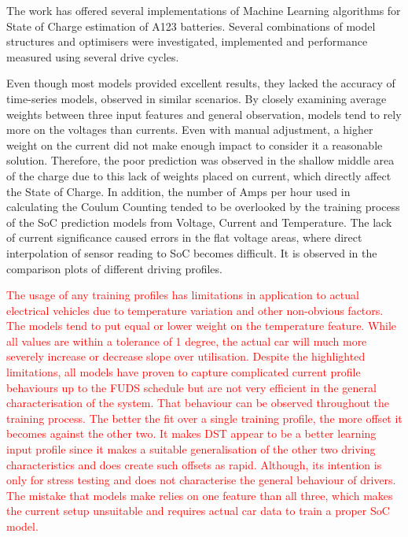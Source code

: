
The work has offered several implementations of Machine Learning algorithms for State of Charge estimation of A123 batteries.
Several combinations of model structures and optimisers were investigated, implemented and performance measured using several drive cycles.

%
%
Even though most models provided excellent results, they lacked the accuracy of time-series models, observed in similar scenarios.
By closely examining average weights between three input features and general observation, models tend to rely more on the voltages than currents.
Even with manual adjustment, a higher weight on the current did not make enough impact to consider it a reasonable solution. 
Therefore, the poor prediction was observed in the shallow middle area of the charge due to this lack of weights placed on current, which directly affect the State of Charge.
In addition, the number of Amps per hour used in calculating the Coulum Counting tended to be overlooked by the training process of the SoC prediction models from Voltage, Current and Temperature.
The lack of current significance caused errors in the flat voltage areas, where direct interpolation of sensor reading to SoC becomes difficult.
It is observed in the comparison plots of different driving profiles. 

%
%
\textcolor{red}{The usage of any training profiles has limitations in application to actual electrical vehicles due to temperature variation and other non-obvious factors.
The models tend to put equal or lower weight on the temperature feature.
While all values are within a tolerance of 1 degree, the actual car will much more severely increase or decrease slope over utilisation.
Despite the highlighted limitations, all models have proven to capture complicated current profile behaviours up to the FUDS schedule but are not very efficient in the general characterisation of the system.
That behaviour can be observed throughout the training process.
The better the fit over a single training profile, the more offset it becomes against the other two.
It makes DST appear to be a better learning input profile since it makes a suitable generalisation of the other two driving characteristics and does create such offsets as rapid.
Although, its intention is only for stress testing and does not characterise the general behaviour of drivers.
The mistake that models make relies on one feature than all three, which makes the current setup unsuitable and requires actual car data to train a proper SoC model.}

